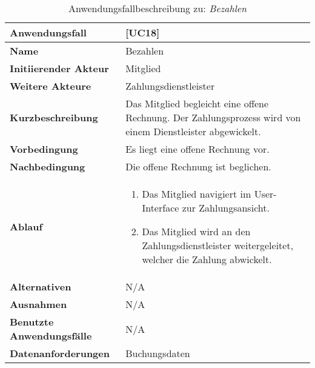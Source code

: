 \begin{table}[H]
    \centering
    \caption{Anwendungsfallbeschreibung zu: \emph{Bezahlen}}
    \label{tab:anwendungsfallbeschreibung_bezahlen}
    \begin{tabularx}{\textwidth}{|l|X|}
        \toprule
        \textbf{Anwendungsfall}           & [UC18]                             \\
        \hline
        \textbf{Name}                     & Bezahlen                           \\
        \hline
        \textbf{Initiierender Akteur}     & Mitglied                           \\
        \hline
        \textbf{Weitere Akteure}          & Zahlungsdienstleister              \\
        \hline
        \textbf{Kurzbeschreibung} & Das Mitglied begleicht eine offene Rechnung.
        Der Zahlungsprozess wird von einem Dienstleister abgewickelt. \\
        \hline
        \textbf{Vorbedingung}             & Es liegt eine offene Rechnung vor. \\
        \hline
        \textbf{Nachbedingung}            & Die offene Rechnung ist beglichen. \\
        \hline
        \textbf{Ablauf} &
        \begin{enumerate}
            \item Das Mitglied navigiert im User-Interface zur Zahlungsansicht.
            \item Das Mitglied wird an den Zahlungsdienstleister weitergeleitet, welcher die Zahlung abwickelt.
        \end{enumerate} \\
        \hline
        \textbf{Alternativen}             & N/A                                \\
        \hline
        \textbf{Ausnahmen}                & N/A                                \\
        \hline
        \textbf{Benutzte Anwendungsfälle} & N/A                                \\
        \hline
        \textbf{Datenanforderungen}       & Buchungsdaten                      \\
        \bottomrule
    \end{tabularx}
\end{table}